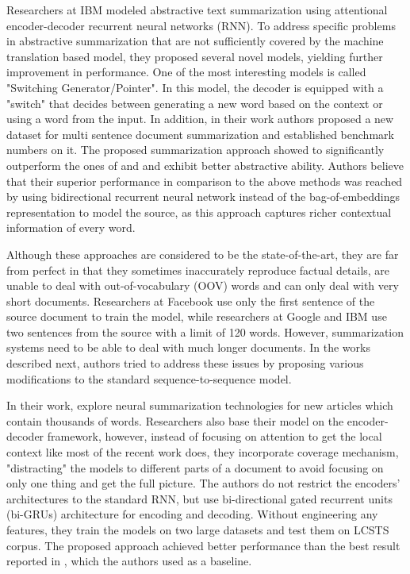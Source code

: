 \documentclass[11pt,a4paper,onecolumn]{article}
\begin{document}
Researchers at IBM \cite{nallapati2016abstractive} modeled abstractive text summarization using attentional encoder-decoder recurrent neural networks (RNN).
To address specific problems in abstractive summarization that are not sufficiently covered by the machine translation based model, they proposed several novel models, yielding further improvement in performance.
One of the most interesting models is called "Switching Generator/Pointer". In this model, the decoder is equipped with a "switch" that decides between generating a new word based on the context or using a word from the input.
In addition, in their work authors proposed a new dataset for multi sentence document summarization and established benchmark numbers on it.
The proposed summarization approach showed to significantly outperform the ones of \cite{rush2015neural} and \cite{chopra2016abstractive} and exhibit better abstractive ability.
Authors believe that their superior performance in comparison to the above methods was reached by using bidirectional recurrent neural network instead of the bag-of-embeddings representation to model the source, as this approach captures richer contextual information of every word.

Although these approaches are considered to be the state-of-the-art, they are far from perfect in that they sometimes inaccurately reproduce factual details, are unable to deal with out-of-vocabulary (OOV) words and can only deal with very short documents.
Researchers at Facebook use only the first sentence of the source document to train the model, while researchers at Google and IBM use two sentences from the source with a limit of 120 words.
However, summarization systems need to be able to deal with much longer documents.
In the works described next, authors tried to address these issues by proposing various modifications to the standard sequence-to-sequence model.

In their work, \cite{chen2016distraction} explore neural summarization technologies for new articles which contain thousands of words.
Researchers also base their model on the encoder-decoder framework, however, instead of focusing on attention to get the local context like most of the recent work does, they incorporate coverage mechanism, "distracting" the models to different parts of a document to avoid focusing on only one thing and get the full picture.
The authors do not restrict the encoders' architectures to the standard RNN, but use bi-directional gated recurrent units (bi-GRUs) architecture for encoding and decoding.
Without engineering any features, they train the models on two large datasets and test them on LCSTS corpus.
The proposed approach achieved better performance than the best result reported in \cite{hu2015lcsts}, which the authors used as a baseline.
\end{document}
